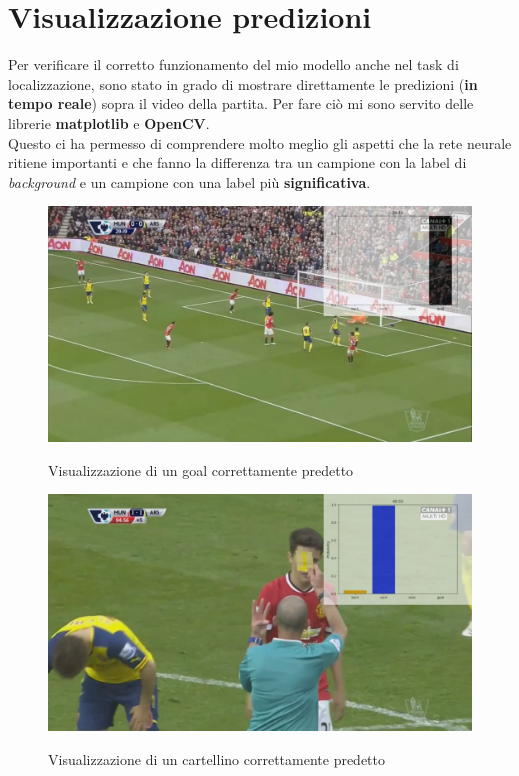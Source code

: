 \section{Visualizzazione predizioni}
Per verificare il corretto funzionamento del mio modello anche nel task di localizzazione, sono stato in grado di mostrare direttamente le predizioni (\textbf{in tempo reale}) sopra il video della partita. Per fare ciò mi sono servito delle librerie \textbf{matplotlib} e \textbf{OpenCV}.
\\Questo ci ha permesso di comprendere molto meglio gli aspetti che la rete neurale ritiene importanti e che fanno la differenza tra un campione con la label di \textit{background} e un campione con una label più \textbf{significativa}.

\begin{figure}[ht]
\centering
\caption{Visualizzazione di un goal correttamente predetto}
\includegraphics[width=\linewidth]{img/videogoalHQ.png}
\label{figure : videogoal}
\end{figure}
\begin{figure}[H]
\centering
\caption{Visualizzazione di un cartellino correttamente predetto}
\includegraphics[width=\linewidth]{img/videocardHQ.png}
\label{figure : videocard}
\end{figure}
